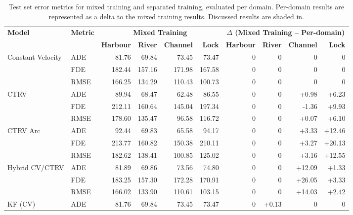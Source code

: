 \begin{table}[t]
\centering
\caption[Exp. II Error metrics]{Test set error metrics for mixed training and separated training, evaluated per domain. Per-domain results are represented as a delta to the mixed training results. Discussed results are shaded in.} %
\label{tab:results_exp1_exp2_merged_deltas}
\setlength{\tabcolsep}{3pt} 
\begin{tabular}{llrrrrrrrr}
\toprule
\textbf{Model} & \textbf{Metric} & 
\multicolumn{4}{c}{\textbf{Mixed Training}} & 
\multicolumn{4}{c}{\textbf{$\Delta$ (Mixed Training -- Per-domain)}} \\
\cmidrule(l){3-6} \cmidrule(l){7-10}
& & 
\textbf{Harbour} & \textbf{River} & \textbf{Channel} & \textbf{Lock} &
\textbf{Harbour} & \textbf{River} & \textbf{Channel} & \textbf{Lock} \\
\midrule
Constant Velocity   
& ADE  & 81.76 & 69.84 & 73.45 & 73.47 & 0 & 0 & 0 & 0 \\
& FDE  & 182.44 & 157.16 & 171.98 & 167.58 & 0 & 0 & 0 & 0 \\
& RMSE & 166.25 & 134.29 & 110.43 & 100.73 & 0 & 0 & 0 & 0 \\
\midrule
CTRV                
& ADE  & 89.94 & 68.47 & 62.48 & 86.55 & 0 & 0 & +0.98 & +6.23 \\
& FDE  & 212.11 & 160.64 & 145.04 & 197.34 & 0 & 0 & -1.36 & +9.93 \\
& RMSE & 178.60 & 135.47 & 96.58 & 116.72 & 0 & 0 & +0.07 & +6.10 \\
\midrule
CTRV Arc            
& ADE  & 92.44 & 69.83 & 65.58 & 94.17 & 0 & 0 & +3.33 & +12.46 \\
& FDE  & 213.77 & 160.82 & 150.38 & 210.11 & 0 & 0 & +3.27 & +20.13 \\
& RMSE & 182.62 & 138.41 & 100.85 & 125.02 & 0 & 0 & +3.16 & +12.55 \\
\midrule
Hybrid CV/CTRV      
& ADE  & 81.89 & 69.86 & 73.56 & 74.80 & 0 & 0 & +12.09 & +1.33 \\
& FDE  & 183.25 & 157.30 & 172.28 & 170.91 & 0 & 0 & +26.05 & +3.33 \\
& RMSE & 166.02 & 133.90 & 110.61 & 103.15 & 0 & 0 & +14.03 & +2.42 \\
\midrule
KF (CV)             
& ADE  & 81.76 & 69.84 & 73.45 & 73.47 & 0 & +0.13 & 0 & 0 \\

\end{tabular}
\end{table}
